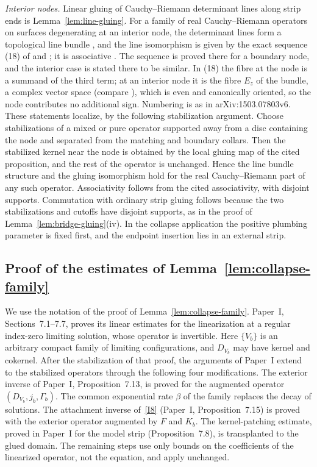 \documentclass[11pt]{amsart}
\theoremstyle{definition}
\theoremstyle{remark}
\theoremstyle{plain}
\numberwithin{equation}{section}
\begin{document}
\emph{Interior nodes.} Linear gluing of Cauchy--Riemann determinant lines
along strip ends is Lemma~\ref{lem:line-gluing}. For a family of real
Cauchy--Riemann operators on surfaces degenerating at an interior node,
the determinant lines form a topological line bundle
\cite[Proposition~2.4.12]{WW-orientations}, and the line isomorphism is
given by the exact sequence (18) of \cite[Theorem~2.4.5]{WW-orientations}
and \cite[Corollary~2.4.7]{WW-orientations}; it is associative
\cite[Proposition~2.4.8]{WW-orientations}. The sequence is proved there
for a boundary node, and the interior case is stated there to be
similar. In (18) the fibre at the node is a summand of the third term;
at an interior node it is the fibre $E_z$ of the bundle, a complex
vector space (compare \cite[Remark~2.4.6]{WW-orientations}), which is
even and canonically oriented, so the node contributes no additional
sign. Numbering is as in arXiv:1503.07803v6. These statements
localize, by the following stabilization argument. Choose stabilizations of a
mixed or pure operator supported away from a disc containing the node and
separated from the matching and boundary collars. Then the stabilized
kernel near the node is obtained by the local gluing map of the cited
proposition, and the rest of the operator is unchanged. Hence the line
bundle structure and the gluing isomorphism hold for the real
Cauchy--Riemann part of any such operator. Associativity follows from the cited
associativity, with disjoint supports.
Commutation with ordinary strip gluing follows because the two
stabilizations and cutoffs have disjoint supports, as in the proof of
Lemma~\ref{lem:bridge-gluing}(iv). In the collapse application the positive plumbing parameter is
fixed first, and the endpoint insertion lies in an external strip.

\subsection{Proof of the estimates of Lemma~\ref{lem:collapse-family}}\label{app:collapse-family}
We use the notation of the proof of Lemma~\ref{lem:collapse-family}. Paper~I, Sections~7.1--7.7, proves its linear estimates for the
linearization at a regular index-zero limiting solution, whose operator
is invertible. Here $\{V_b\}$ is an arbitrary compact family of limiting
configurations, and $D_{V_b}$ may have kernel and cokernel. After the
stabilization of that proof, the arguments of Paper~I extend to the
stabilized operators through the following four modifications. The
exterior inverse of Paper~I, Proposition~7.13, is proved for the
augmented operator $(D_{V_b},j_b,\Gamma_b)$. The common exponential rate
$\beta$ of the family replaces the decay of solutions. The attachment
inverse of~\ref{I8} (Paper~I, Proposition~7.15) is proved with the
exterior operator
augmented by $F$ and $K_b$. The kernel-patching estimate, proved in
Paper~I for the model strip (Proposition~7.8), is transplanted to the
glued domain. The remaining steps use only bounds on the coefficients of
the linearized operator, not the equation, and apply unchanged.
\end{document}

